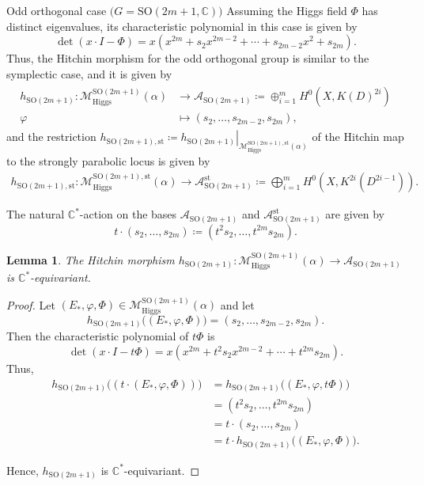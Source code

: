 \documentclass[11pt, reqno]{amsart}
\makeatletter
\numberwithin{equation}{section}
\newtheorem{lemma}[theorem]{Lemma}
\def\subsubsection{\@startsection{subsubsection}{3}%
  \normalparindent\z@{-.5em}%
  {\normalfont\itshape}}
\theoremstyle{definition}
\makeatother
\begin{document}
\subsubsection{Odd orthogonal case $\mathrm{(}G=\mathrm{SO}(2m+1,\mathbb{C})\mathrm{)}$}
Assuming the Higgs field $\Phi$ has distinct eigenvalues, its characteristic polynomial in this case is given by
\[
\det(x\cdot I - \Phi) = x(x^{2m} + s_2x^{2m-2} + \cdots + s_{2m-2}x^2+ s_{2m}).
\]
Thus, the Hitchin morphism for the odd orthogonal group is similar to the symplectic case, and it is given by
\begin{align}
\begin{split}
    h_{\mathrm{SO}(2m+1)} : \mathcal{M}^{\mathrm{SO}(2m+1)}_{\mathrm{Higgs}}(\alpha) &\rightarrow \mathcal{A}_{\mathrm{SO}(2m+1)} \coloneqq \oplus_{i=1}^{m} H^0(X, K(D)^{2i})\\
    \varphi &\mapsto (s_2, \dots, s_{2m-2},s_{2m}),
    \end{split}
\end{align}
and the restriction $ h_{\mathrm{SO}(2m+1), \mathrm{st}} \coloneqq \left.h_{\mathrm{SO}(2m+1)}\right|_{\mathcal{M}^{\mathrm{SO}(2m+1),\mathrm{st}}_{\mathrm{Higgs}}(\alpha)}$ of the Hitchin map to the strongly parabolic locus is given by
\begin{align}
    h_{\mathrm{SO}(2m+1), \mathrm{st}}: \mathcal{M}^{\mathrm{SO}(2m+1),\mathrm{st}}_{\mathrm{Higgs}}(\alpha) \rightarrow \mathcal{A}^{\mathrm{st}}_{\mathrm{SO}(2m+1)} \coloneqq \bigoplus_{i=1}^{m} H^0(X, K^{2i}(D^{2i-1})).
\end{align}



The natural $\mathbb{C}^*$-action on the bases $\mathcal{A}_{\mathrm{SO}(2m+1)}$ and $\mathcal{A}^{\mathrm{st}}_{\mathrm{SO}(2m+1)}$ are given by 
\[
t\cdot (s_2,\dots, s_{2m}) \coloneqq (t^2s_2, \dots, t^{2m}s_{2m}).
\]

\begin{lemma}\label{equivariant2}
    The Hitchin morphism $h_{\mathrm{SO}(2m+1)} : \mathcal{M}^{\mathrm{SO}(2m+1)}_{\mathrm{Higgs}}(\alpha) \rightarrow \mathcal{A}_{\mathrm{SO}(2m+1)}$ is $\mathbb{C}^*$-equivariant.
\end{lemma}
\begin{proof}
Let $(E_*,\varphi,\Phi)\in \mathcal{M}^{\mathrm{SO}(2m+1)}_{\mathrm{Higgs}}(\alpha)$ and let $$h_{\mathrm{SO}(2m+1)}\big((E_*,\varphi,\Phi)\big) = (s_2,\dots, s_{2m-2},s_{2m}).$$
  Then the characteristic polynomial of $t\Phi$ is 
    \[
\det(x\cdot I - t\Phi) = x(x^{2m} + t^2s_2x^{2m-2} + \cdots + t^{2m}s_{2m}).
\]
Thus, 
\begin{align*}
   h_{\mathrm{SO}(2m+1)}\big((t\cdot (E_*,\varphi,\Phi))\big) &=h_{\mathrm{SO}(2m+1)}\big((E_*,\varphi,t\Phi)\big)\\ 
   &=(t^2s_2,\dots , t^{2m}s_{2m}) \\
   &= t\cdot (s_2,\dots ,s_{2m}) \\
   &= t\cdot h_{\mathrm{SO}(2m+1)}\big((E_*,\varphi,\Phi)\big). 
\end{align*}

Hence, $h_{\mathrm{SO}(2m+1)}$ is $\mathbb{C}^*$-equivariant.
\end{proof}
\end{document}
